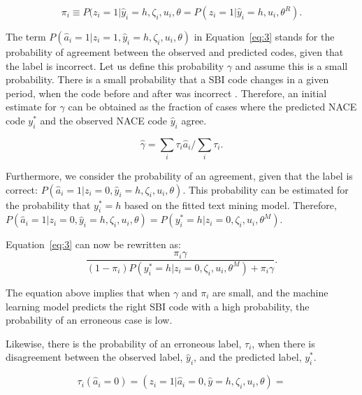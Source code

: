 \documentclass[12pt, a4paper, titlepage]{article}
\begin{document}
						\begin{equation}\label{eq:pi4}
\pi_i \equiv P(z_i = 1|\hat{y}_i = h, \zeta_i, u_i, \theta = P(z_i = 1|\hat{y}_i = h, u_i, \theta^R) .
						\end{equation} 



The term $P(\hat{a}_i=1|z_i=1, \hat{y}_i = h, \zeta_i, u_i, \theta)$ in Equation~\ref{eq:3} stands for the probability of agreement between the observed and predicted codes, given that the label is incorrect. Let us define this probability 
$\gamma$ and assume this is a small probability. There is a small probability that a SBI code changes in a given period, when the code before and after was incorrect \citep{VanDelden}. Therefore, an initial estimate for $\gamma$ can be obtained as the fraction of cases where the predicted NACE code $y^*_i$ and the observed NACE code $\hat{y}_i$ agree. 

						\begin{equation}\label{eq:gamma5}
\hat{\gamma} = \sum_{i} \tau_i \hat{a}_i / \sum_{i} \tau_i.
						\end{equation} 


Furthermore, we consider the probability of an agreement, given that the label is correct: $P(\hat{a}_i=1|z_i=0, \hat{y}_i = h, \zeta_i, u_i, \theta)$. This probability can be estimated for the probability that $y^*_i = h$ based on the fitted text mining model. Therefore, $P(\hat{a}_i=1|z_i=0, \hat{y}_i = h, \zeta_i, u_i, \theta) = P(y^*_i = h | z_i = 0, \zeta_i, u_i, \theta^M)$. 


Equation~\ref{eq:3} can now be rewritten as:
						\begin{equation}\label{eq:6}
\frac{\pi_i \gamma}{(1-\pi_i)P(y^*_i = h | z_i = 0, \zeta_i, u_i, \theta^M) + \pi_i \gamma  }.
						\end{equation}

The equation above implies that when $\gamma$ and $\pi_i$ are small, and the machine learning model predicts the right SBI code with a high probability, the probability of an erroneous case is low.

Likewise, there is the probability of an erroneous label, $\tau_i$, when there is disagreement between the observed label, $\hat{y}_i$,  and the predicted label, $y^*_i$. 

						\begin{equation}\label{eq:7}
\tau_i(\hat{a}_i = 0) = (z_i = 1 | \hat{a}_i = 0, \hat{y} = h, \zeta_i, u_i, \theta) = 
						\end{equation}
\end{document}
